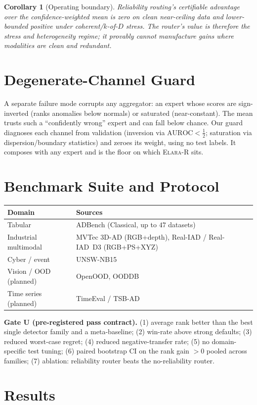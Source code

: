 \documentclass[11pt]{article}
\newtheorem{corollary}{Corollary}
\newcommand{\router}{\textsc{Elara-R}}
\begin{document}
\begin{corollary}[Operating boundary]
Reliability routing's certifiable advantage over the confidence-weighted mean is
zero on clean near-ceiling data and lower-bounded positive under coherent/$k$-of-$D$
stress. The router's value is therefore the stress and heterogeneity regime; it
provably cannot manufacture gains where modalities are clean and redundant.
\end{corollary}

\section{Degenerate-Channel Guard}\label{sec:guard}
A separate failure mode corrupts any aggregator: an expert whose scores are
sign-inverted (ranks anomalies below normals) or saturated (near-constant). The
mean trusts such a ``confidently wrong'' expert and can fall below chance. Our guard
diagnoses each channel from validation (inversion via $\mathrm{AUROC}<\tfrac12$;
saturation via dispersion/boundary statistics) and zeroes its weight, using no test
labels. It composes with any expert and is the floor on which \router{} sits.

\section{Benchmark Suite and Protocol}
\begin{tabular}{ll}
\toprule Domain & Sources \\\midrule
Tabular & ADBench (Classical, up to $47$ datasets) \\
Industrial multimodal & MVTec 3D-AD (RGB+depth), Real-IAD / Real-IAD~D3 (RGB+PS+XYZ) \\
Cyber / event & UNSW-NB15 \\
Vision / OOD (planned) & OpenOOD, OODDB \\
Time series (planned) & TimeEval / TSB-AD \\\bottomrule
\end{tabular}

\noindent\textbf{Gate U (pre-registered pass contract).} (1) average rank better
than the best single detector family and a meta-baseline; (2) win-rate above strong
defaults; (3) reduced worst-case regret; (4) reduced negative-transfer rate; (5) no
domain-specific test tuning; (6) paired bootstrap CI on the rank gain $>0$ pooled
across families; (7) ablation: reliability router beats the no-reliability router.

\section{Results}
\end{document}
